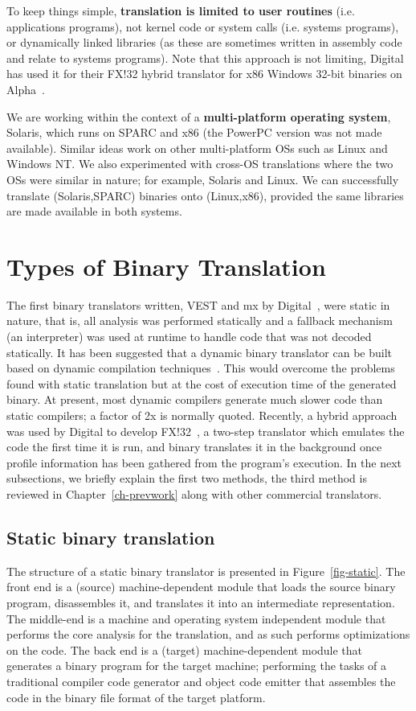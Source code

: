 To keep things simple, {\bf translation is limited to user routines} (i.e. 
applications programs), not kernel code or system calls (i.e. systems 
programs), or dynamically linked libraries (as these are sometimes written 
in assembly code and relate to systems programs).  
Note that this approach is not limiting, Digital has used it for their
FX!32 hybrid translator for x86 Windows 32-bit binaries on 
Alpha~\cite{Hook97}.  

We are working within the context of a {\bf multi-platform operating 
system}, Solaris, which runs on SPARC and x86 (the PowerPC version
was not made available).  Similar ideas work on other multi-platform 
OSs such as Linux and Windows NT.  We also experimented with cross-OS 
translations where the two OSs were similar in nature; for example, 
Solaris and Linux.  We can successfully translate (Solaris,SPARC) 
binaries onto (Linux,x86), provided the same libraries are made available
in both systems.   


\section{Types of Binary Translation}
The first binary translators written, VEST and mx by Digital~\cite{Site93}, 
were static in nature, that is, all analysis was performed statically and a 
fallback mechanism (an interpreter) was used at runtime to handle code 
that was not decoded statically. 
It has been suggested that a dynamic binary translator can be 
built based on dynamic compilation techniques~\cite{Cifu96c}.  
This would overcome the problems found with static translation but 
at the cost of execution time of the generated binary.  At present, most 
dynamic compilers generate much slower code than static compilers; a 
factor of 2x is normally quoted.
Recently, a hybrid approach was used by Digital to develop 
FX!32~\cite{Hook97,Thom96}, a two-step translator which emulates the
code the first time it is run, and binary translates it in the 
background once profile information has been gathered from the 
program's execution. 
In the next subsections, we briefly explain the first two methods,
the third method is reviewed in Chapter~\ref{ch-prevwork} along
with other commercial translators.


\subsection{Static binary translation}
The structure of a static binary translator is presented in
Figure~\ref{fig-static}.  The front end is a (source) machine-dependent module
that loads the source binary program, disassembles it, and translates it
into an intermediate representation.  The middle-end is a machine and
operating system independent module that performs the core analysis for
the translation, and as such performs optimizations on the code.  The back end
is a (target) machine-dependent module that generates a binary program for the
target machine; performing the tasks of a traditional compiler code generator
and object code emitter that assembles the code in the binary file format of
the target platform.
 
